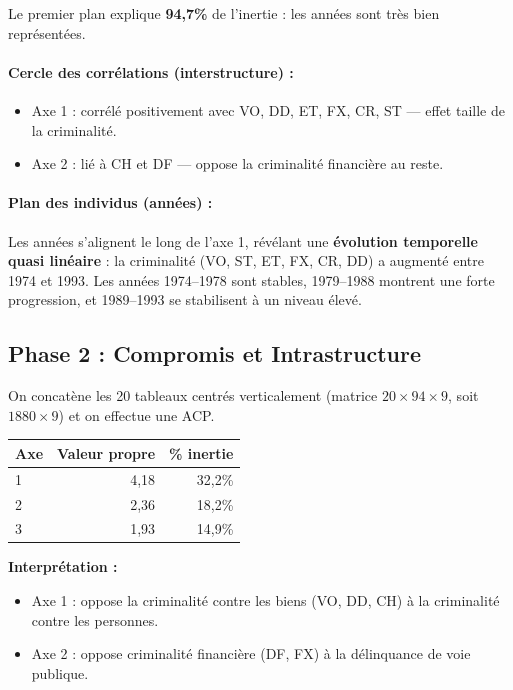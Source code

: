 \documentclass[a4paper,11pt]{article}
\begin{document}
Le premier plan explique \textbf{94,7\%} de l'inertie : les années sont très bien représentées.

\paragraph{Cercle des corrélations (interstructure) :}
\begin{itemize}
    \item Axe 1 : corrélé positivement avec VO, DD, ET, FX, CR, ST — \og effet taille \fg{} de la criminalité.
    \item Axe 2 : lié à CH et DF — oppose la criminalité financière au reste.
\end{itemize}

\paragraph{Plan des individus (années) :}
Les années s'alignent le long de l'axe 1, révélant une \textbf{évolution temporelle quasi linéaire} : la criminalité (VO, ST, ET, FX, CR, DD) a augmenté entre 1974 et 1993. Les années 1974--1978 sont stables, 1979--1988 montrent une forte progression, et 1989--1993 se stabilisent à un niveau élevé.

\subsection{Phase 2 : Compromis et Intrastructure}

On concatène les 20 tableaux centrés verticalement (matrice $20 \times 94 \times 9$, soit $1880 \times 9$) et on effectue une ACP.

\begin{center}
\begin{tabular}{lrr}
\hline
Axe & Valeur propre & \% inertie \\
\hline
1 & 4,18 & 32,2\% \\
2 & 2,36 & 18,2\% \\
3 & 1,93 & 14,9\% \\
\hline
\end{tabular}
\end{center}

\textbf{Interprétation :}
\begin{itemize}
    \item Axe 1 : oppose la criminalité contre les biens (VO, DD, CH) à la criminalité contre les personnes.
    \item Axe 2 : oppose criminalité financière (DF, FX) à la délinquance de voie publique.
\end{itemize}
\end{document}
